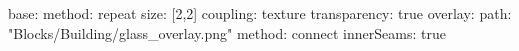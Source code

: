 base:
  method: repeat
  size: [2,2]
  coupling: texture
  transparency: true
overlay:
  path: "Blocks/Building/glass_overlay.png"
  method: connect
  innerSeams: true